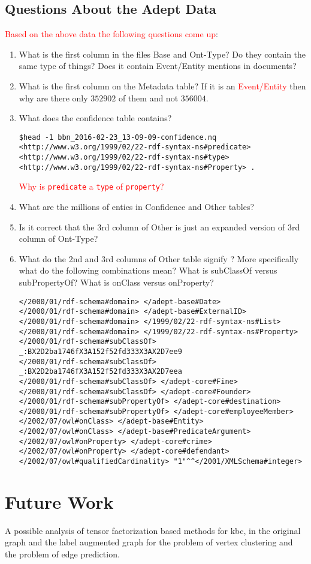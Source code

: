 \documentclass{tufte-handout}
\newcommand{\alert}[1]{\textcolor{red}{#1}}
\begin{document}
\subsection{Questions About the Adept Data}
\label{sec:quest-about-adept}

\alert{Based on the above data the following questions come up}:
\begin{enumerate}
\item What is the first column in the files Base and Ont-Type? Do they contain
  the same type of things? Does it contain Event/Entity mentions in documents?
\item What is the first column on the Metadata table? If it is an
  \alert{Event/Entity} then why are there only $352902$ of them and not
  $356004$.
\item What does the confidence table contains?
\begin{verbatim}
$head -1 bbn_2016-02-23_13-09-09-confidence.nq
<http://www.w3.org/1999/02/22-rdf-syntax-ns#predicate> <http://www.w3.org/1999/02/22-rdf-syntax-ns#type> <http://www.w3.org/1999/02/22-rdf-syntax-ns#Property> .
\end{verbatim}
\alert{Why is \texttt{predicate} a \texttt{type} of \texttt{property}?}
\item What are the millions of enties in Confidence and Other tables?
\item Is it correct that the 3rd column of Other is just an expanded version of
  3rd column of Ont-Type?
\item What do the 2nd and 3rd columns of Other table signify ? More specifically
  what do the following combinations mean? What is subClassOf versus
  subPropertyOf? What is onClass versus onProperty?
\begin{verbatim}
</2000/01/rdf-schema#domain> </adept-base#Date>
</2000/01/rdf-schema#domain> </adept-base#ExternalID>
</2000/01/rdf-schema#domain> </1999/02/22-rdf-syntax-ns#List>
</2000/01/rdf-schema#domain> </1999/02/22-rdf-syntax-ns#Property>
</2000/01/rdf-schema#subClassOf> _:BX2D2ba1746fX3A152f52fd333X3AX2D7ee9
</2000/01/rdf-schema#subClassOf> _:BX2D2ba1746fX3A152f52fd333X3AX2D7eea
</2000/01/rdf-schema#subClassOf> </adept-core#Fine>
</2000/01/rdf-schema#subClassOf> </adept-core#Founder>
</2000/01/rdf-schema#subPropertyOf> </adept-core#destination>
</2000/01/rdf-schema#subPropertyOf> </adept-core#employeeMember>
</2002/07/owl#onClass> </adept-base#Entity>
</2002/07/owl#onClass> </adept-base#PredicateArgument>
</2002/07/owl#onProperty> </adept-core#crime>
</2002/07/owl#onProperty> </adept-core#defendant>
</2002/07/owl#qualifiedCardinality> "1"^^</2001/XMLSchema#integer>
\end{verbatim}

\end{enumerate}


\clearpage
\section{Future Work}
\label{sec:future-work}
A possible analysis of tensor factorization based methods for kbc, in the
original graph and the label augmented graph for the problem of vertex
clustering and the problem of edge prediction.



\end{document}
